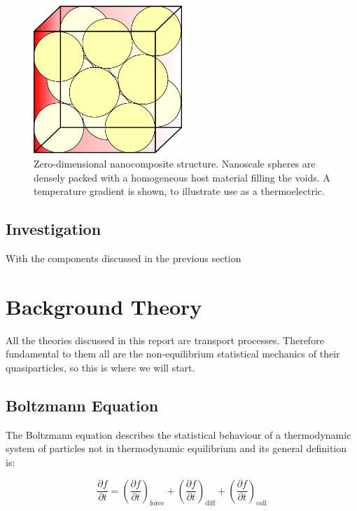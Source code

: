 \documentclass[12pt,draft]{article}
\begin{document}
\begin{figure}
	\centering
	\includegraphics[width=0.5\textwidth]{nanospheres-cube.eps}
	\caption{Zero-dimensional nanocomposite structure. Nanoscale spheres are densely packed with a homogeneous host material filling the voids. A temperature gradient is shown, to illustrate use as a thermoelectric.}
	\label{fig:nanospheres-cube}
\end{figure}

\subsection{Investigation}
With the components discussed in the previous section


\section{Background Theory}
All the theories discussed in this report are transport processes. Therefore fundamental to them all are the non-equilibrium statistical mechanics of their quasiparticles, so this is where we will start.

\subsection{Boltzmann Equation}
The Boltzmann equation describes the statistical behaviour of a thermodynamic system of particles not in thermodynamic equilibrium and its general definition is:

\begin{equation}
\label{boltz-trans}
	\frac{\partial f}{\partial t} = \left(\frac{\partial f}{\partial
	t}\right)_\mathrm{force} + \left(\frac{\partial f}{\partial t}\right)_\mathrm{diff}+ \left(\frac{\partial f}{\partial t}\right)_\mathrm{coll}
\end{equation}
\end{document}

